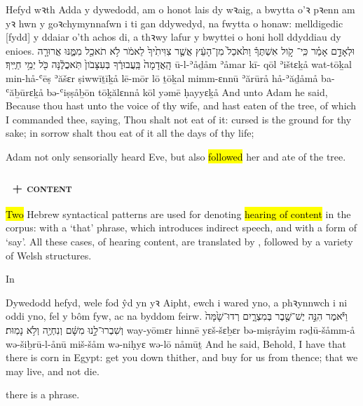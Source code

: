 \begin{example}{1}{3}{17}{}{}
	\quoling
	{Hefyd wꝛth Adda y dywedodd, am  o honot  lais dy wꝛaig, a bwytta o'ꝛ pꝛenn am yꝛ hwn y goꝛchymynnaſwn i ti gan ddywedyd, na fwytta o honaw: melldigedic [fydd] y ddaiar o'th achos di, a thꝛwy lafur y bwyttei o honi holl ddyddiau dy enioes.}
	{וּלְאָדָ֣ם אָמַ֗ר כִּֽי־ קֹ֣ול אִשְׁתֶּךָ֒ וַתֹּ֙אכַל֙ מִן־הָעֵ֔ץ אֲשֶׁ֤ר צִוִּיתִ֙יךָ֙ לֵאמֹ֔ר לֹ֥א תֹאכַ֖ל מִמֶּ֑נּוּ אֲרוּרָ֤ה הָֽאֲדָמָה֙ בַּֽעֲבוּרֶ֔ךָ בְּעִצָּבֹון֙ תֹּֽאכֲלֶ֔נָּה כֹּ֖ל יְמֵ֥י חַיֶּֽיךָ׃}
	{ū-l-ʾåḏåm ʾåmar kī- qōl ʾištɛḵå wat-tōḵal min-hå-ʿēṣ ʾăšɛr ṣiwwīṯīḵå lē-mōr lō ṯōḵal mimm-ɛnnū ʾărūrå hå-ʾăḏåmå ba-ʿăḇūrɛḵå bə-ʿiṣṣåḇōn tōḵălɛnnå kōl yəmē ḥayyɛḵå}
	{And unto Adam he said, Because thou hast  {unto} the voice of thy wife, and hast eaten of the tree, of which I commanded thee, saying, Thou shalt not eat of it: cursed is the ground for thy sake; in sorrow shalt thou eat of it all the days of thy life;}
\end{example}
\begin{paper}
	\explain Adam not only sensorially heard Eve, but also \hl{followed} her and ate of the tree.
\end{paper}



\subsubsection{\shama~+ \textsc{content}}

\begin{paper}
	{\click} {\click} \hl{Two} Hebrew syntactical patterns are used for denoting \hl{hearing of content} in the corpus: {\shama} with a  ‘that’ phrase, which introduces indirect speech, and {\shama} with a form of  ‘say’. All these cases, of hearing content, are translated by , followed by a variety of Welsh structures.

	In
\end{paper}

\begin{example}{1}{42}{2}{}{}
	\quoling
	{Dywedodd hefyd, wele  fod ŷd yn yꝛ Aipht, ewch i wared yno, a phꝛynnwch i ni oddi yno, fel y bôm fyw, ac na byddom feirw.}
	{וַיֹּ֕אמֶר הִנֵּ֣ה   יֶשׁ־שֶׁ֖בֶר בְּמִצְרָ֑יִם רְדוּ־שָׁ֙מָּה֙ וְשִׁבְרוּ־לָ֣נוּ מִשָּׁ֔ם וְנִחְיֶ֖ה וְלֹ֥א נָמֽוּת׃}
	{way-yōmɛr hinnē   yɛš-šɛḇɛr bə-miṣråyim rəḏū-šåmm-å wə-šiḇrū-l-ånū miš-šåm wə-niḥyɛ wə-lō nåmūṯ}
	{And he said, Behold, I have  that there is corn in Egypt: get you down thither, and buy for us from thence; that we may live, and not die.}
\end{example}
\begin{paper}
	\explain there is a  phrase.
\end{paper}


